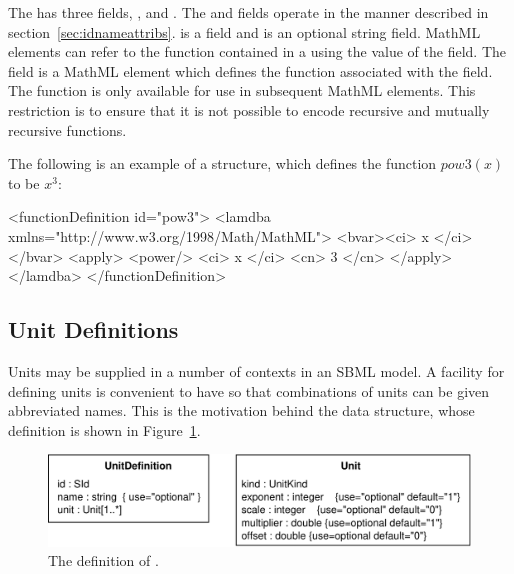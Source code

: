 \documentclass[10pt,twocolumntoc]{cekarticle}
\newcommand{\vref}[1]{\ref{#1}}
\begin{document}
The  has three fields, ,
 and . The  and
 fields operate in the manner described in
section~\ref{sec:idnameattribs}.   is a 
field and  is an optional string field. MathML
elements can refer to the function contained in a
 using the value of the  field.
The  field is a MathML  element
which defines the function associated with the  field.
The function is only available for use in subsequent MathML
elements.  This restriction is to ensure that it is not possible to encode recursive and mutually recursive functions.

The following is an example of a  structure,
which defines the function $pow3(x)$ to be $x^{3}$:

\begin{example}
<functionDefinition id="pow3">
    <lamdba xmlns="http://www.w3.org/1998/Math/MathML">
        <bvar><ci> x </ci></bvar>
        <apply>
            <power/>
            <ci> x </ci>
            <cn> 3 </cn>
        </apply>
    </lamdba>
</functionDefinition>
\end{example}

\subsection{Unit Definitions}
\label{sec:unitdefinitions}

Units may be supplied in a number of contexts in an SBML model.  A
facility for defining units is convenient to have so that
combinations of units can be given abbreviated names.  This is the
motivation behind the  data structure, whose
definition is shown in Figure~\vref{fig:unitdefinition}.

\begin{figure}[htb]
  \centering
  \includegraphics[scale = 0.68]{unitdefinition}
  \caption{The definition of .}
  \label{fig:unitdefinition}
\end{figure}
\end{document}
